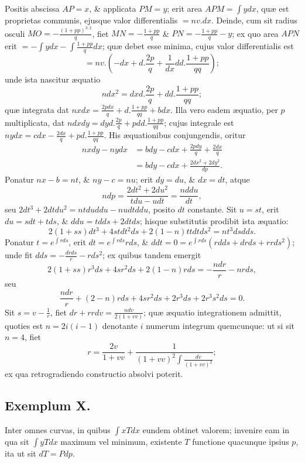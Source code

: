 Positis abscissa $AP=x$, \& applicata $PM=y$; erit area
$APM=\int ydx$, quæ est proprietas communis, ejusque valor differentialis $=nv.dx$. Deinde, cum sit radius osculi $MO=-\frac{(1+pp)^{3:2}}q$, fiet $MN=-\frac{1+pp}q$ \& $PN=-\frac{1+pp}q-y$; ex quo area $APN$ erit $=-\int ydx-\int\frac{1+pp}qdx$; quæ debet esse minima, cujus valor differentialis est
\[=nv.\left(-dx+d.\frac{2p}q+\frac1{dx}dd.\frac{1+pp}{qq}\right);\]
unde ista nascitur æquatio
\[ndx^2=dxd.\frac{2p}q+dd.\frac{1+pp}{qq};\]
quæ integrata dat $nxdx=\frac{2pdx}q+d.\frac{1+pp}{qq}+bdx$. Illa vero eadem æquatio, per $p$ multiplicata, dat $ndxdy=dyd.\frac{2p}q+pdd.\frac{1+pp}{qq}$; cujus integrale est $nydx=cdx-\frac{2dx}q+pd.\frac{1+pp}{qq}$. His æquationibus conjungendis, oritur
\[
\begin{aligned}
nxdy-nydx&=bdy-cdx+\frac{2pdy}q+\frac{2dx}q\\
&=bdy-cdx+\frac{2dx^2+2dy^2}{dp}.
\end{aligned}
\]
Ponatur $nx-b=nt$, \& $ny-c=nu$; erit $dy=du$, \& $dx=dt$, atque
\[ndp=\frac{2dt^2+2du^2}{tdu-udt}=\frac{nddu}{dt},\]
seu $2dt^3+2dtdu^2=ntduddu-nudtddu$, posito $dt$ constante. Sit $u=st$, erit $du=sdt+tds$, \& $ddu=tdds+2dtds$; hisque substitutis prodibit ista æquatio:
\[2(1+ss)dt^3+4stdt^2ds+2(1-n)ttdtds^2=nt^3dsdds.\]
Ponatur $t=e^{\int rds}$, erit $dt=e^{\int rds}rds$, \& $ddt=0=e^{\int rds}(rdds+drds+rrds^2)$; unde fit $dds=-\frac{drds}r-rds^2$; ex quibus tandem emergit
\[2(1+ss)r^3ds+4sr^2ds+2(1-n)rds=-\frac{ndr}r-nrds,\]
seu
\[\frac{ndr}r+(2-n)rds+4sr^2ds+2r^3ds+2r^3s^2ds=0.\]
Sit $s=v-\frac1r$, fiet $dr+rrdv=\frac{ndv}{2(1+vv)}$; quæ æquatio integrationem admittit, quoties est $n=2i(i-1)$ denotante $i$ numerum integrum quemcunque: ut si sit $n=4$, fiet
\[r=\frac{2v}{1+vv}+\frac1{(1+vv)^2\int\frac{dv}{(1+vv)^2}};\]
ex qua retrogradiendo constructio absolvi poterit.

\subsection*{Exemplum X.}
Inter omnes curvas, in quibus $\int xTdx$ eundem obtinet valorem; invenire eam in qua sit $\int yTdx$ maximum vel minimum, existente $T$ functione quacunque ipsius $p$, ita ut sit $dT=Pdp$.

